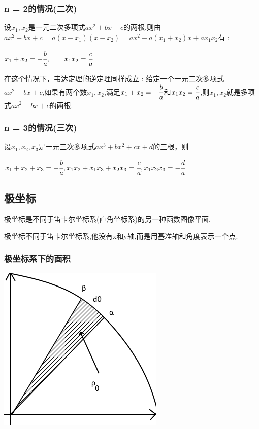\documentclass[UTF8,12pt]{ctexbook}
\begin{document}
{{{\subsubsection{n = 2的情况(二次)}{
  设$x_1,x_2$是一元二次多项式$ax^2 + bx + c$的两根,则由$ax^2 +bx + c = a(x - x_1)(x - x_2) = ax^2 - a(x_1 + x_2)x + ax_1x_2$有 :

  $x_1 + x_2 = -\cfrac{b}{a},\qquad x_1x_2 = \cfrac{c}{a}$

  在这个情况下，韦达定理的逆定理同样成立 : 给定一个一元二次多项式$ax^2 + bx + c$,如果有两个数$x_1,x_2$,满足$x_1 + x_2 = -\cfrac{b}{a}$和$x_1x_2 = \cfrac{c}{a}$,则$x_1,x_2$就是多项式$ax^2 + bx + c$的两根.
}%

\subsubsection{n = 3的情况(三次)}{
  设$x_1,x_2,x_3$是一元三次多项式$ax^3 + bx^2 + cx + d$的三根，则

  $x_1 + x_2 + x_3 = -\cfrac{b}{a}, x_1x_2 + x_1x_3 + x_2x_3 = \cfrac{c}{a},x_1x_2x_3 = -\cfrac{d}{a}$
}%

}%

\subsection{极坐标}{
极坐标是不同于笛卡尔坐标系(直角坐标系)的另一种函数图像平面.

极坐标不同于笛卡尔坐标系,他没有x和y轴,而是用基准轴和角度表示一个点.

\subsubsection{极坐标系下的面积}{
  \begin{center}
    \includegraphics{resources/polar_coordness.png}
  \end{center}

}}}}
\end{document}
